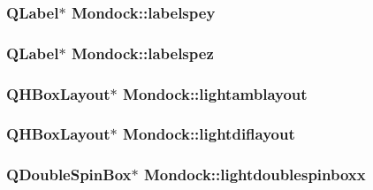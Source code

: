 \hypertarget{class_mondock_a51f3374b36482300513cfaa0d9e7cb44}{
\subsubsection[{labelspey}]{\setlength{\rightskip}{0pt plus 5cm}Q\+Label$\ast$ Mondock\+::labelspey\hspace{0.3cm}{\ttfamily [private]}}}\label{class_mondock_a51f3374b36482300513cfaa0d9e7cb44}
\hypertarget{class_mondock_af00a5126b8b2d537b5a46064b4d26d76}{
\subsubsection[{labelspez}]{\setlength{\rightskip}{0pt plus 5cm}Q\+Label$\ast$ Mondock\+::labelspez\hspace{0.3cm}{\ttfamily [private]}}}\label{class_mondock_af00a5126b8b2d537b5a46064b4d26d76}
\hypertarget{class_mondock_ada46a57b4e681dc6f9420ae74f46fefc}{
\subsubsection[{lightamblayout}]{\setlength{\rightskip}{0pt plus 5cm}Q\+H\+Box\+Layout$\ast$ Mondock\+::lightamblayout\hspace{0.3cm}{\ttfamily [private]}}}\label{class_mondock_ada46a57b4e681dc6f9420ae74f46fefc}
\hypertarget{class_mondock_a82bd5ea86bfd95368bdef210a807b1c4}{
\subsubsection[{lightdiflayout}]{\setlength{\rightskip}{0pt plus 5cm}Q\+H\+Box\+Layout$\ast$ Mondock\+::lightdiflayout\hspace{0.3cm}{\ttfamily [private]}}}\label{class_mondock_a82bd5ea86bfd95368bdef210a807b1c4}
\hypertarget{class_mondock_a16569a61106b1c9d6506d1d2a2600759}{
\subsubsection[{lightdoublespinboxx}]{\setlength{\rightskip}{0pt plus 5cm}Q\+Double\+Spin\+Box$\ast$ Mondock\+::lightdoublespinboxx\hspace{0.3cm}{\ttfamily [private]}}}\label{class_mondock_a16569a61106b1c9d6506d1d2a2600759}
